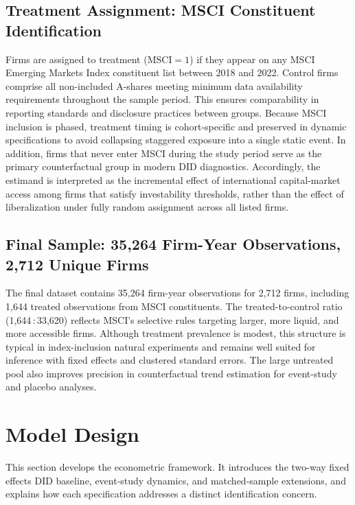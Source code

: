 \subsection{Treatment Assignment: MSCI Constituent Identification}

Firms are assigned to treatment ($\mathrm{MSCI} = 1$) if they appear on any MSCI Emerging Markets Index constituent list between 2018 and 2022. Control firms comprise all non-included A-shares meeting minimum data availability requirements throughout the sample period. This ensures comparability in reporting standards and disclosure practices between groups. Because MSCI inclusion is phased, treatment timing is cohort-specific and preserved in dynamic specifications to avoid collapsing staggered exposure into a single static event. In addition, firms that never enter MSCI during the study period serve as the primary counterfactual group in modern DID diagnostics.
Accordingly, the estimand is interpreted as the incremental effect of international capital-market access among firms that satisfy investability thresholds, rather than the effect of liberalization under fully random assignment across all listed firms.

\subsection{Final Sample: 35,264 Firm-Year Observations, 2,712 Unique Firms}

The final dataset contains 35,264 firm-year observations for 2,712 firms, including 1,644 treated observations from MSCI constituents. The treated-to-control ratio (1,644\,:\,33,620) reflects MSCI's selective rules targeting larger, more liquid, and more accessible firms. Although treatment prevalence is modest, this structure is typical in index-inclusion natural experiments and remains well suited for inference with fixed effects and clustered standard errors. The large untreated pool also improves precision in counterfactual trend estimation for event-study and placebo analyses.

\section{Model Design}

This section develops the econometric framework. It introduces the two-way fixed effects DID baseline, event-study dynamics, and matched-sample extensions, and explains how each specification addresses a distinct identification concern.

